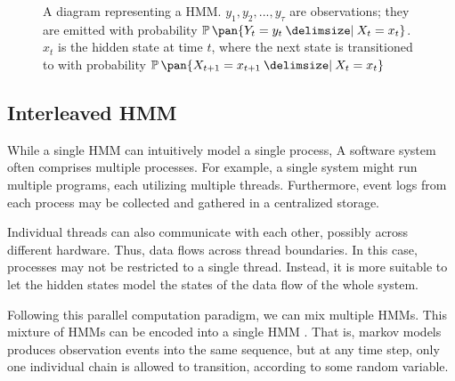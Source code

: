 \begin{figure}
    \caption{A diagram representing a HMM. \(y_1, y_2, ..., y_\tau\) are observations; they are emitted with probability \(\prob\pan{Y_t = y_t \giv X_t = x_t}\). \(x_t\) is the hidden state at time \(t\), where the next state is transitioned to with probability \(\prob\pan{X_{t + 1} = x_{t+1} \giv X_t = x_t}\)}
    \label{fig:hmm}
    \vspace{2ex}
\end{figure}

\subsection{Interleaved HMM}

While a single HMM can intuitively model a single process, A software system often comprises multiple processes. For example, a single system might run multiple programs, each utilizing multiple threads. Furthermore, event logs from each process may be collected and gathered in a centralized storage. 

Individual threads can also communicate with each other, possibly across different hardware. Thus, data flows across thread boundaries. In this case, processes may not be restricted to a single thread. Instead, it is more suitable to let the hidden states model the states of the data flow of the whole system.

Following this parallel computation paradigm, we can mix multiple HMMs. This mixture of HMMs can be encoded into a single HMM \cite{Minot2014-gn}. That is, markov models produces observation events into the same sequence, but at any time step, only one individual chain is allowed to transition, according to some random variable.

